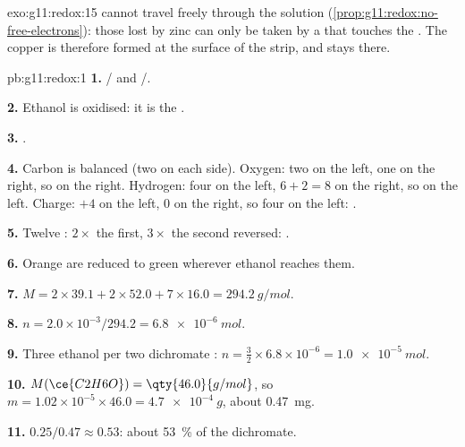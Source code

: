 \begin{solution}{exo:g11:redox:15}
 cannot travel freely through the solution
(\cref{prop:g11:redox:no-free-electrons}): those lost by zinc  can
only be taken by a   that touches the . The copper
 is therefore formed at the surface of the strip, and stays there.
\end{solution}

\begin{solution}{pb:g11:redox:1}
\textbf{1.} / and /.

\textbf{2.} Ethanol is oxidised: it is the .

\textbf{3.} .

\textbf{4.} Carbon is balanced (two on each side). Oxygen: two on the
left, one on the right, so  on the right. Hydrogen: four on the
left, $6 + 2 = 8$ on the right, so  on the left. Charge: $+4$ on
the left, 0 on the right, so four  on the left:
.

\textbf{5.} Twelve : $2\times$ the first, $3\times$ the second
reversed:
.

\textbf{6.} Orange   are reduced to green
  wherever ethanol reaches them.

\textbf{7.} $M = 2\times 39.1 + 2\times 52.0 + 7\times 16.0 =
\qty{294.2}{g/mol}$.

\textbf{8.} $n = 2.0\times 10^{-3}/294.2 = \qty{6.8e-6}{mol}$.

\textbf{9.} Three ethanol  per two dichromate :
$n = \tfrac{3}{2}\times 6.8\times 10^{-6} = \qty{1.0e-5}{mol}$.

\textbf{10.} $M(\ce{C2H6O}) = \qty{46.0}{g/mol}$, so
$m = 1.02\times 10^{-5}\times 46.0 = \qty{4.7e-4}{g}$, about
\qty{0.47}{mg}.

\textbf{11.} $0.25/0.47 \approx 0.53$: about \qty{53}{\percent} of the
dichromate.


\end{solution}

